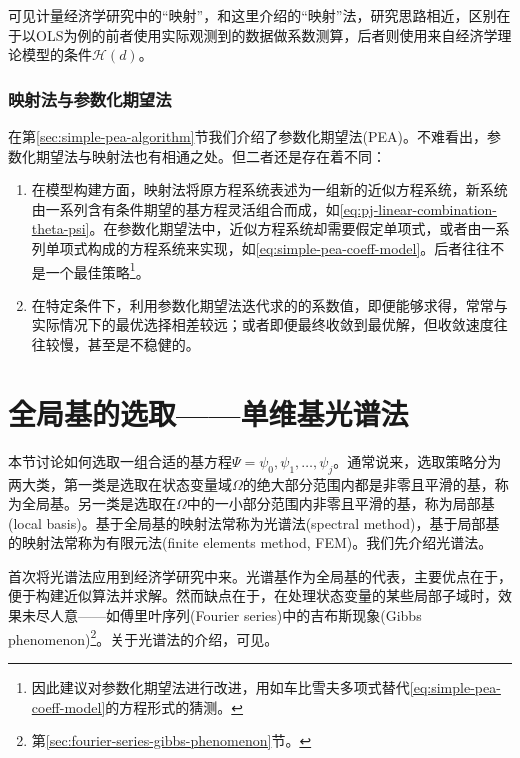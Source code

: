 可见计量经济学研究中的``映射''，和这里介绍的``映射''法，研究思路相近，区别在于以OLS为例的前者使用实际观测到的数据做系数测算，后者则使用来自经济学理论模型的条件$\mathcal{H}(d)$。

\subsubsection{映射法与参数化期望法}
在第\ref{sec:simple-pea-algorithm}节我们介绍了参数化期望法(PEA)。不难看出，参数化期望法与映射法也有相通之处。但二者还是存在着不同：
\begin{enumerate}
  \item 在模型构建方面，映射法将原方程系统表述为一组新的近似方程系统，新系统由一系列含有条件期望的基方程灵活组合而成，如\eqref{eq:pj-linear-combination-theta-psi}。在参数化期望法中，近似方程系统却需要假定单项式，或者由一系列单项式构成的方程系统来实现，如\eqref{eq:simple-pea-coeff-model}。后者往往不是一个最佳策略\footnote{\cite{Christiano:2000bw}因此建议对参数化期望法进行改进，用如车比雪夫多项式替代\eqref{eq:simple-pea-coeff-model}的方程形式的猜测。}。

  \item 在特定条件下，利用参数化期望法迭代求的的系数值，即便能够求得，常常与实际情况下的最优选择相差较远；或者即便最终收敛到最优解，但收敛速度往往较慢，甚至是不稳健的。
\end{enumerate}

\section{全局基的选取——单维基光谱法}
\label{sec:pj-spectral-method-global}

本节讨论如何选取一组合适的基方程$\Psi = \psi_0, \psi_1, \ldots, \psi_j$。通常说来，选取策略分为两大类，第一类是选取在状态变量域$\Omega$的绝大部分范围内都是非零且平滑的基，称为全局基。另一类是选取在$\Omega$中的一小部分范围内非零且平滑的基，称为局部基(local basis)。基于全局基的映射法常称为光谱法(spectral method)，基于局部基的映射法常称为有限元法(finite elements method, FEM)。我们先介绍光谱法。

\cite{Judd:1992gs}首次将光谱法应用到经济学研究中来。光谱基作为全局基的代表，主要优点在于，便于构建近似算法并求解。然而缺点在于，在处理状态变量的某些局部子域时，效果未尽人意——如傅里叶序列(Fourier series)中的吉布斯现象(Gibbs phenomenon)\footnote{第\ref{sec:fourier-series-gibbs-phenomenon}节。}。关于光谱法的介绍，可见\cite{Shen:2011tf}。

